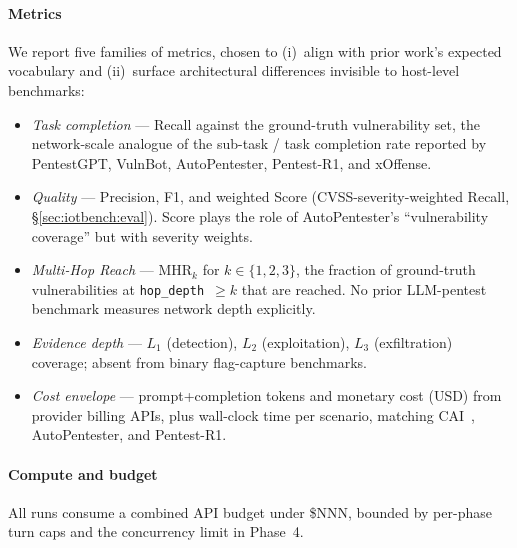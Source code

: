 \paragraph{Metrics}
We report five families of metrics, chosen to (i)~align with prior work's
expected vocabulary and (ii)~surface architectural differences invisible to
host-level benchmarks:
\begin{itemize}
  \item \emph{Task completion} --- Recall against the ground-truth vulnerability
  set, the network-scale analogue of the sub-task / task completion rate
  reported by PentestGPT, VulnBot, AutoPentester, Pentest-R1, and xOffense.
  \item \emph{Quality} --- Precision, F1, and weighted Score
  (CVSS-severity-weighted Recall, \S\ref{sec:iotbench:eval}). Score plays the
  role of AutoPentester's ``vulnerability coverage'' but with severity weights.
  \item \emph{Multi-Hop Reach} --- MHR$_k$ for $k\in\{1,2,3\}$, the fraction of
  ground-truth vulnerabilities at \texttt{hop\_depth}~$\geq k$ that are reached.
  No prior LLM-pentest benchmark measures network depth explicitly.
  \item \emph{Evidence depth} --- $L_1$ (detection), $L_2$ (exploitation), $L_3$
  (exfiltration) coverage; absent from binary flag-capture benchmarks.
  \item \emph{Cost envelope} --- prompt+completion tokens and monetary cost
  (USD) from provider billing APIs, plus wall-clock time per scenario,
  matching CAI~\cite{cai25}, AutoPentester, and Pentest-R1.
\end{itemize}

\paragraph{Compute and budget}
All runs consume a combined API budget under \$NNN, bounded by per-phase turn
caps and the concurrency limit in Phase~4.
